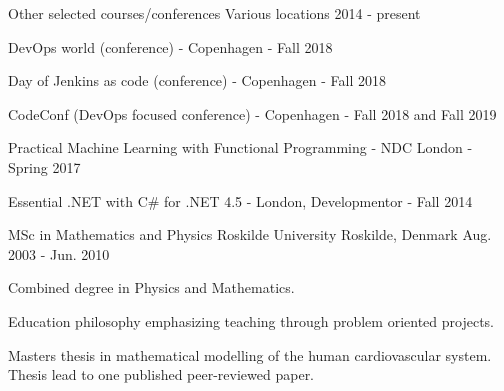 \begin{cventries}
\cventry
{Other selected courses/conferences} %
{Various locations} %
{} %
{2014 - present} %
{ %
\begin{cvitems}
\item{DevOps world (conference) - Copenhagen - Fall 2018}
\item{Day of Jenkins as code (conference) - Copenhagen - Fall 2018}
\item {CodeConf (DevOps focused conference) - Copenhagen - Fall 2018 and Fall 2019}
\item {Practical Machine Learning with Functional Programming - NDC London - Spring 2017}
\item {Essential .NET with C\# for .NET 4.5 - London, Developmentor - Fall 2014}
\end{cvitems}
}

\cventry
{MSc in Mathematics and Physics} %
{Roskilde University}
{Roskilde, Denmark} %
{Aug. 2003 - Jun. 2010} %
{ %
\begin{cvitems}
\item {Combined degree in Physics and Mathematics.}
\item {Education philosophy emphasizing teaching through problem oriented projects.}
\item Masters thesis in mathematical modelling of the human cardiovascular system. Thesis lead to one published peer-reviewed paper.
\end{cvitems}
}


\end{cventries}
